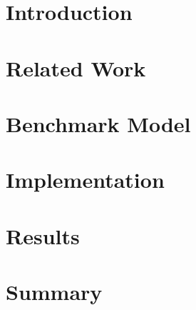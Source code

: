 \documentclass{llncs}
\begin{document}

\section{Introduction}
\label{sec:intro}


\section{Related Work}
\label{sec:related}


\section{Benchmark Model}
\label{sec:benchmark_model}


\section{Implementation}
\label{sec:implementation}


\section{Results}
\label{sec:results}


\section{Summary}
\label{sec:summary}


\printbibliography
\end{document}
